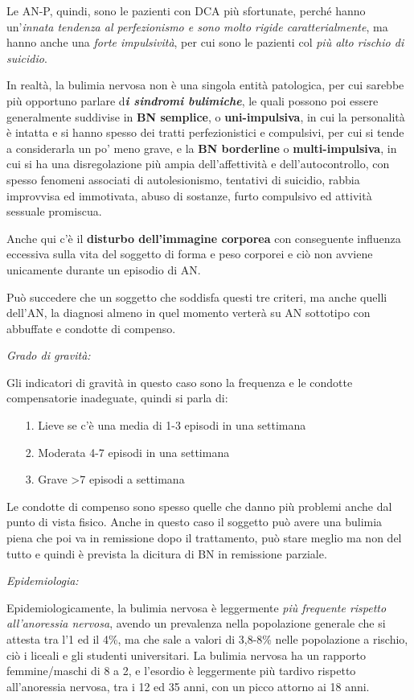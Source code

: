 Le AN-P, quindi, sono le pazienti con DCA più sfortunate, perché hanno
un'\emph{innata tendenza al perfezionismo e sono molto rigide
caratterialmente}, ma hanno anche una \emph{forte impulsività}, per cui
sono le pazienti col \emph{più alto rischio di suicidio}.

In realtà, la bulimia nervosa non è una singola entità patologica, per
cui sarebbe più opportuno parlare d\textbf{\emph{i sindromi bulimiche}},
le quali possono poi essere generalmente suddivise in \textbf{BN
semplice}, o \textbf{uni-impulsiva}, in cui la personalità è intatta e
si hanno spesso dei tratti perfezionistici e compulsivi, per cui si
tende a considerarla un po' meno grave, e la \textbf{BN borderline} o
\textbf{multi-impulsiva}, in cui si ha una disregolazione più ampia
dell'affettività e dell'autocontrollo, con spesso fenomeni associati di
autolesionismo, tentativi di suicidio, rabbia improvvisa ed immotivata,
abuso di sostanze, furto compulsivo ed attività sessuale promiscua.

Anche qui c'è il \textbf{disturbo dell'immagine corporea} con
conseguente influenza eccessiva sulla vita del soggetto di forma e peso
corporei e ciò non avviene unicamente durante un episodio di AN.

Può succedere che un soggetto che soddisfa questi tre criteri, ma anche
quelli dell'AN, la diagnosi almeno in quel momento verterà su AN
sottotipo con abbuffate e condotte di compenso.

\emph{\emph{Grado di gravità:}}

Gli indicatori di gravità in questo caso sono la frequenza e le condotte
compensatorie inadeguate, quindi si parla di:

\begin{itemize}
\item[1.]
  Lieve se c'è una media di 1-3 episodi in una settimana
\item[2.]
  Moderata 4-7 episodi in una settimana
\item[3.]
  Grave \textgreater{}7 episodi a settimana
\end{itemize}

Le condotte di compenso sono spesso quelle che danno più problemi anche
dal punto di vista fisico. Anche in questo caso il soggetto può avere
una bulimia piena che poi va in remissione dopo il trattamento, può
stare meglio ma non del tutto e quindi è prevista la dicitura di BN in
remissione parziale.

\emph{\emph{Epidemiologia: }}

Epidemiologicamente, la bulimia nervosa è leggermente \emph{più
frequente rispetto all'anoressia nervosa}, avendo un prevalenza nella
popolazione generale che si attesta tra l'1 ed il 4\%, ma che sale a
valori di 3,8-8\% nelle popolazione a rischio, ciò i liceali e gli
studenti universitari. La bulimia nervosa ha un rapporto femmine/maschi
di 8 a 2, e l'esordio è leggermente più tardivo rispetto all'anoressia
nervosa, tra i 12 ed 35 anni, con un picco attorno ai 18 anni.


